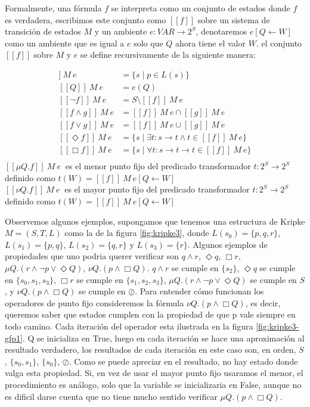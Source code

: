 Formalmente, una fórmula $f$ se interpreta como un conjunto de estados donde $f$ es verdadera, escribimos este conjunto como $[[f]]$ sobre un sistema de transición de estados $M$ y un ambiente $e: VAR \to 2^{S}$, denotaremos $e[Q \gets W]$ como un ambiente que es igual a $e$ solo que $Q$ ahora tiene el valor $W$. el conjunto $[[f]]$ sobre $M$ y $e$ se define recursivamente de la siguiente manera:

\begin{align*}
 [[p]]\ M\ e &= \{s \mid p \in L(s)\}  \\
 [[Q]]\ M\ e &= e(Q) \\
 [[\neg f]]\ M\ e &= S \setminus [[f]]\ M\ e \\
 [[f \land g]]\ M\ e &= [[f]]\ M\ e \cap [[g]]\ M\ e \\
 [[f \lor g]]\ M\ e &= [[f]]\ M\ e \cup [[g]]\ M\ e \\
 [[\Diamond f]]\ M\ e &= \{s \mid \exists t : s \to t \land t \in [[f]]\ M\ e\} \\
 [[\Box f]]\ M\ e &= \{s \mid \forall t : s \to t  \rightarrow t \in [[f]]\ M\ e\} \\
\end{align*}
$[[\mu Q. f]] \ M\ e\ $ es el menor punto fijo del predicado transformador $t:2^{S} \to 2^{S}$ definido como $t(W) = [[f]]\ M\ e[Q \gets W] $ \\
$[[\nu Q. f]] \ M\ e\ $ es el mayor punto fijo del predicado transformador $t:2^{S} \to 2^{S}$ definido como $t(W) = [[f]]\ M\ e[Q \gets W] $

Observemos algunos ejemplos, supongamos que tenemos una estructura de Kripke $M = (S,T,L)$ como la de la figura \ref{fig:kripke3}, donde $L(s_{0}) = \{p,q,r\}$, $L(s_{1}) = \{p,q\}$, $L(s_{2}) = \{q,r\}$ y $L(s_{3}) = \{r\}$. Algunos ejemplos de propiedades que uno podria querer verificar son $q \land r$, $\Diamond q$, $\Box r$, $\mu Q. (r \land \neg p \lor \Diamond Q)$, $\nu Q. (p \land \Box Q)$. $q \land r$ se cumple en $\{s_{2}\}$, $\Diamond q$ se cumple en $\{s_{0},s_{1},s_{3}\}$, $\Box r$ se cumple en $\{s_{1},s_{2},s_{3}\}$, $\mu Q. (r \land \neg p \lor \Diamond Q)$ se cumple en $S$, y $\nu Q. (p \land \Box Q)$ se cumple en $\oslash$. Para entender cómo funcionan los operadores de punto fijo consideremos la fórmula $\nu Q. (p \land \Box Q)$, es decir, queremos saber que estados cumplen con la propiedad de que p vale siempre en todo camino. Cada iteración del operador esta ilustrada en la figura \ref{fig:kripke3-gfp1}. Q se inicializa en True, luego en cada iteración se hace una aproximación al resultado verdadero, los resultados de cada iteración en este caso son, en orden, $S$, $\{s_{0},s_{1}\}$, $\{s_{0}\}$, $\oslash$. Como se puede apreciar en el resultado, no hay estado donde valga esta propiedad. Si, en vez de usar el mayor punto fijo usaramos el menor, el procedimiento es análogo, solo que la variable se inicializaria en False, aunque no es dificil darse cuenta que no tiene mucho sentido verificar $\mu Q.(p \land \Box Q)$.

